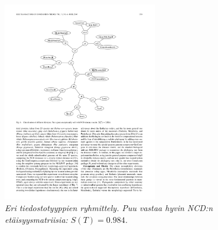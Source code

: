 \documentclass[12pt,finnish]{tktltiki2}
\theoremstyle{definition}
\theoremstyle{remark}
\begin{document}
    \begin{figure}[tb]
      \immediate{}
      \includegraphics[width=0.6\textwidth]{img/classification}
      \caption{\emph{Eri tiedostotyyppien ryhmittely. Puu vastaa hyvin NCD:n etäisyysmatriisia: $S(T)=0.984$.}
      \cite{CV05} }
      \label{fig:classification}
    \end{figure}
\end{document}
